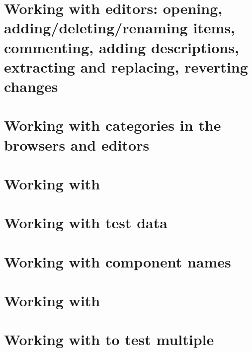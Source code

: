 \section{Working with editors: opening, adding/deleting/renaming items, commenting, adding descriptions, extracting and replacing, reverting changes}
\label{WorkingWithEditors}


\section{Working with categories in the browsers and editors}
\label{WorkingWithCategories}


\clearpage
\section{Working with \gdcases{}}
\label{WorkingWithTestCases}


\clearpage

\section{Working with test data}
\label{WorkingWithData}


\clearpage

\section{Working with component names}
\label{reass}



\clearpage

\section{Working with \gdsuites{}}
\label{WorkingWithSuites}


\clearpage 

\section{Working with \gdjobs{} to test multiple \gdauts{}}
\label{WorkingWithJobs}


